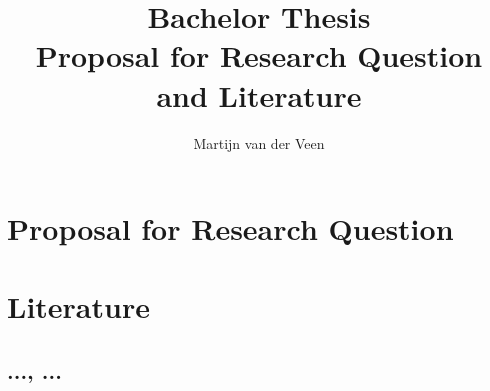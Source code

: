 \documentclass[11pt]{article}
\title{Bachelor Thesis \\
       Proposal for Research Question and Literature}
\author{Martijn van der Veen}
\begin{document}
\maketitle

\section*{Proposal for Research Question}


\section*{Literature}

\subsection*{..., ...}



\end{document}
